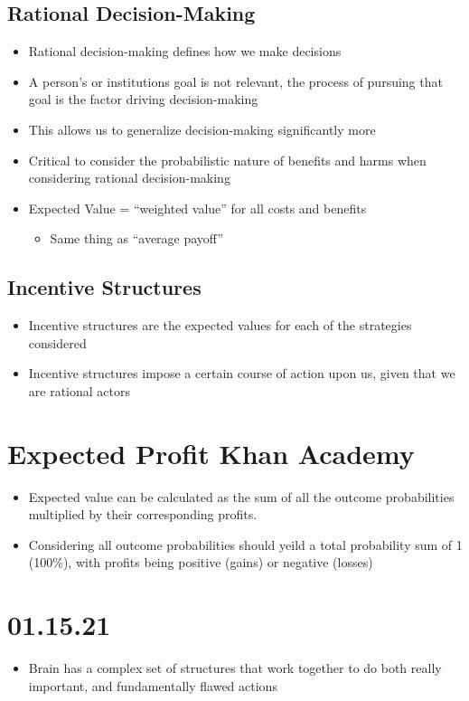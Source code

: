 \documentclass[11pt]{article}
\begin{document}
\subsection{Rational Decision-Making}
\label{sec:org4735795}
\begin{itemize}
\item Rational decision-making defines how we make decisions
\item A person's or institutions goal is not relevant, the process of pursuing that goal is the factor driving decision-making
\item This allows us to generalize decision-making significantly more
\item Critical to consider the probabilistic nature of benefits and harms when considering rational decision-making
\item Expected Value = ``weighted value'' for all costs and benefits
\begin{itemize}
\item Same thing as ``average payoff''
\end{itemize}
\end{itemize}
\subsection{Incentive Structures}
\label{sec:org612b195}
\begin{itemize}
\item Incentive structures are the expected values for each of the strategies considered
\item Incentive structures impose a certain course of action upon us, given that we are rational actors
\end{itemize}
\section{Expected Profit Khan Academy}
\label{sec:orgfdad87d}
\begin{itemize}
\item Expected value can be calculated as the sum of all the outcome probabilities multiplied by their corresponding profits.
\item Considering all outcome probabilities should yeild a total probability sum of 1 (100\%), with profits being positive (gains) or negative (losses)
\end{itemize}
\section{01.15.21}
\label{sec:orgc18705d}
\begin{itemize}
\item Brain has a complex set of structures that work together to do both really important, and fundamentally flawed actions
\end{itemize}
\end{document}
